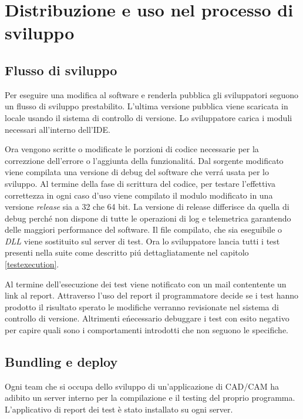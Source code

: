 \chapter{Distribuzione e uso nel processo di sviluppo}
    \section{Flusso di sviluppo}
        Per eseguire una modifica al software e renderla pubblica gli sviluppatori seguono un flusso di sviluppo prestabilito.
        L'ultima versione pubblica viene scaricata in locale usando il sistema di controllo di versione.
        Lo sviluppatore carica i moduli necessari all'interno dell'IDE.

        Ora vengono scritte o modificate le porzioni di codice necessarie per la correzzione dell'errore o l'aggiunta della funzionalit\'a.
        Dal sorgente modificato viene compilata una versione di debug del software che verr\'a usata per lo sviluppo.
        Al termine della fase di scrittura del codice, per testare l'effettiva correttezza in ogni caso d'uso viene compilato il modulo modificato in una versione \textit{release} sia a 32 che 64 bit.
        La versione di release differisce da quella di debug perch\'e non dispone di tutte le operazioni di log e telemetrica garantendo delle maggiori performance del software.
        Il file compilato, che sia eseguibile o \textit{DLL} viene sostituito sul server di test.
        Ora lo sviluppatore lancia tutti i test presenti nella suite come descritto pi\'u dettagliatamente nel capitolo \ref{testexecution}.
        
        Al termine dell'esecuzione dei test viene notificato con un mail contentente un link al report.
        Attraverso l'uso del report il programmatore decide se i test hanno prodotto il risultato sperato le modifiche verranno revisionate nel sistema di controllo di versione.
        Altrimenti e\' necessario debuggare i test con esito negativo per capire quali sono i comportamenti introdotti che non seguono le specifiche. 

    \section{Bundling e deploy}
        Ogni team che si occupa dello sviluppo di un'applicazione di CAD/CAM ha adibito un server interno per la compilazione e il testing del proprio programma.
        L'applicativo di report dei test è stato installato su ogni server.

